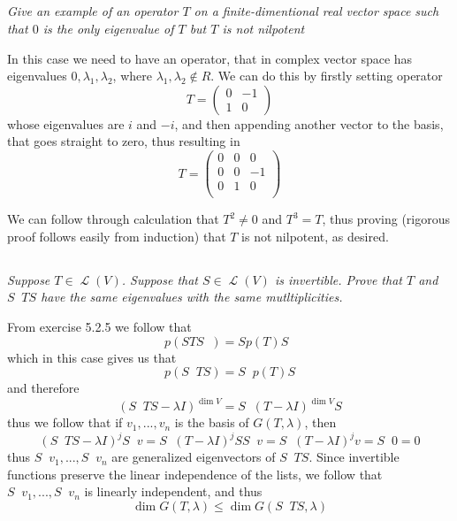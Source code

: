 \documentclass[11pt,oneside,titlepage]{book}
\DeclareMathOperator \map {\mathcal {L}}
\DeclareMathOperator \inv {^{-1}}
\begin{document}
\subsection{}

\textit{Give an example of an operator $T$ on a finite-dimentional real vector space
  such that $0$ is the only eigenvalue of $T$ but $T$ is not nilpotent}

In this case we need to have an operator, that in complex vector space has eigenvalues
$0, \lambda_1, \lambda_2$, where $\lambda_1, \lambda_2 \notin R$. We can do this
by firstly setting operator
$$T =
\begin{pmatrix}
  0& -1 \\
  1 & 0
\end{pmatrix}
$$
whose eigenvalues are $i$ and $-i$, and then appending another vector to the basis, that goes
straight to zero, thus resulting in
$$T =
\begin{pmatrix}
  0 & 0 & 0 \\
  0 & 0 & -1 \\
  0 & 1 & 0 \\
\end{pmatrix}
$$

We can follow through calculation that $T^2 \neq 0$ and $T^3 = T$, thus proving (rigorous
proof follows easily from induction) that $T$ is not nilpotent, as desired.

\subsection{}

\textit{Suppose $T \in \map(V)$. Suppose that $S \in \map(V)$ is invertible. Prove that $T$
  and $S\inv T S$ have the same eigenvalues with the same mutltiplicities.}

From exercise 5.2.5 we follow that
$$p(S T S \inv) = S p(T)  S \inv$$
which in this case gives us  that
$$p(S\inv T S) = S \inv p(T) S$$
and therefore
$$(S\inv T S - \lambda I)^{\dim V} = S\inv (T  - \lambda I)^{\dim V} S$$
thus we follow that if $v_1, ..., v_n$ is the basis of $G(T, \lambda)$, then
$$ (S\inv T S  - \lambda I)^j S \inv v=  S\inv ( T  - \lambda I)^j S S \inv v=
S\inv ( T  - \lambda I)^j  v=  S\inv 0 = 0$$
thus $S\inv v_1, ..., S\inv v_n$ are generalized eigenvectors of $S\inv T S$. Since invertible
functions preserve the linear independence of the lists, we follow that
$S\inv v_1, ..., S\inv v_n$ is linearly independent, and thus
$$\dim G(T, \lambda) \leq \dim G(S \inv T S, \lambda) $$
\end{document}
